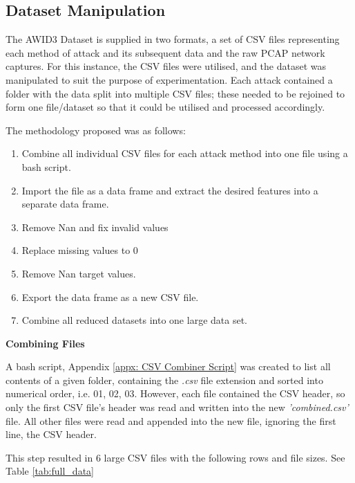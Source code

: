 \subsection{Dataset Manipulation}

The AWID3 Dataset is supplied in two formats, a set of CSV files representing each method of attack and its subsequent data and the raw PCAP network captures. For this instance, the CSV files were utilised, and the dataset was manipulated to suit the purpose of experimentation. Each attack contained a folder with the data split into multiple CSV files; these needed to be rejoined to form one file/dataset so that it could be utilised and processed accordingly. 

\medskip
The methodology proposed was as follows:
\begin{enumerate}
    \item Combine all individual CSV files for each attack method into one file using a bash script.
    \item Import the file as a data frame and extract the desired features into a separate data frame.
    \item Remove Nan and fix invalid values
    \item Replace missing values to 0
    \item Remove Nan target values.
    \item Export the data frame as a new CSV file.
    \item Combine all reduced datasets into one large data set.
\end{enumerate}

\medskip

\textbf{Combining Files}

\smallskip
A bash script, Appendix \ref{appx: CSV Combiner Script} was created to list all contents of a given folder, containing the \textit{.csv} file extension and sorted into numerical order, i.e. 01, 02, 03. However, each file contained the CSV header, so only the first CSV file's header was read and written into the new \textit{'combined.csv'} file. All other files were read and appended into the new file, ignoring the first line, the CSV header. 

This step resulted in 6 large CSV files with the following rows and file sizes. See Table \ref{tab:full_data}

